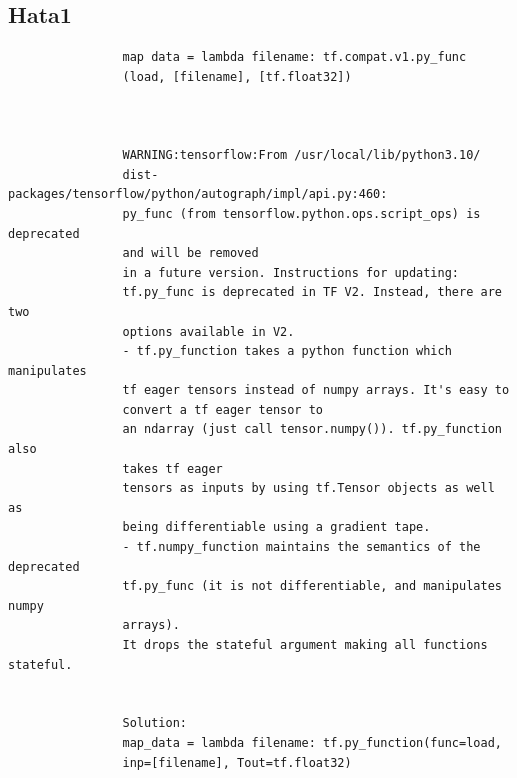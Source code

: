 \documentclass[12pt, a4paper]{article}
\begin{document}
			\subsection{Hata1} 	
			\vspace*{1\baselineskip}
			\begin{verbatim}
				map data = lambda filename: tf.compat.v1.py_func
				(load, [filename], [tf.float32])
				
				
				
				WARNING:tensorflow:From /usr/local/lib/python3.10/
				dist-packages/tensorflow/python/autograph/impl/api.py:460: 
				py_func (from tensorflow.python.ops.script_ops) is deprecated 
				and will be removed
				in a future version. Instructions for updating:
				tf.py_func is deprecated in TF V2. Instead, there are two 
				options available in V2.
				- tf.py_function takes a python function which manipulates 
				tf eager tensors instead of numpy arrays. It's easy to 
				convert a tf eager tensor to
				an ndarray (just call tensor.numpy()). tf.py_function also 
				takes tf eager
				tensors as inputs by using tf.Tensor objects as well as
				being differentiable using a gradient tape.
				- tf.numpy_function maintains the semantics of the deprecated
				tf.py_func (it is not differentiable, and manipulates numpy 
				arrays). 
				It drops the stateful argument making all functions stateful.
				
				
				Solution:
				map_data = lambda filename: tf.py_function(func=load, 
				inp=[filename], Tout=tf.float32)
			\end{verbatim}
			
			\newpage
			
\end{document}
